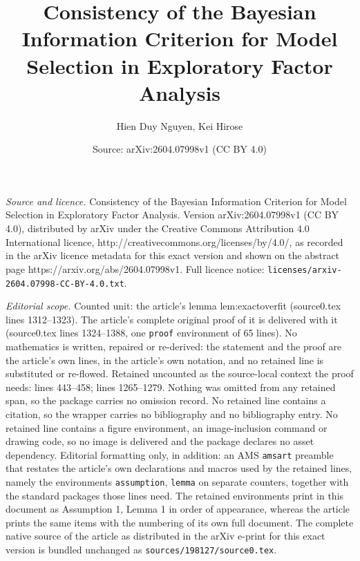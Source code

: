 \documentclass[10pt,a4paper]{amsart}
\title{Consistency of the Bayesian Information Criterion for Model Selection in Exploratory Factor Analysis}
\author{Hien Duy Nguyen, Kei Hirose}
\date{Source: arXiv:2604.07998v1 (CC BY 4.0)}
\begin{document}
\maketitle

\noindent\emph{Source and licence.} Consistency of the Bayesian Information Criterion for Model Selection in Exploratory Factor Analysis. Version arXiv:2604.07998v1 (CC BY 4.0), distributed by arXiv under the Creative Commons Attribution 4.0 International licence, http://creativecommons.org/licenses/by/4.0/, as recorded in the arXiv licence metadata for this exact version and shown on the abstract page https://arxiv.org/abs/2604.07998v1. Full licence notice: \texttt{licenses/arxiv-2604.07998-CC-BY-4.0.txt}.\par\smallskip

\noindent\textit{Editorial scope.} Counted unit: the article's lemma lem:exactoverfit (source0.tex lines 1312--1323). The article's complete original proof of it is delivered with it (source0.tex lines 1324--1388, one \texttt{proof} environment of 65 lines). No mathematics is written, repaired or re-derived: the statement and the proof are the article's own lines, in the article's own notation, and no retained line is substituted or re-flowed.  Retained uncounted as the source-local context the proof needs: lines 443--458; lines 1265--1279.  Nothing was omitted from any retained span, so the package carries no omission record.  No retained line contains a citation, so the wrapper carries no bibliography and no bibliography entry.  No retained line contains a figure environment, an image-inclusion command or drawing code, so no image is delivered and the package declares no asset dependency.  Editorial formatting only, in addition: an AMS \texttt{amsart} preamble that restates the article's own declarations and macros used by the retained lines, namely the environments \texttt{assumption}, \texttt{lemma} on separate counters, together with the standard packages those lines need.  The retained environments print in this document as Assumption 1, Lemma 1 in order of appearance, whereas the article prints the same items with the numbering of its own full document.  The complete native source of the article as distributed in the arXiv e-print for this exact version is bundled unchanged as \texttt{sources/198127/source0.tex}.
\end{document}
